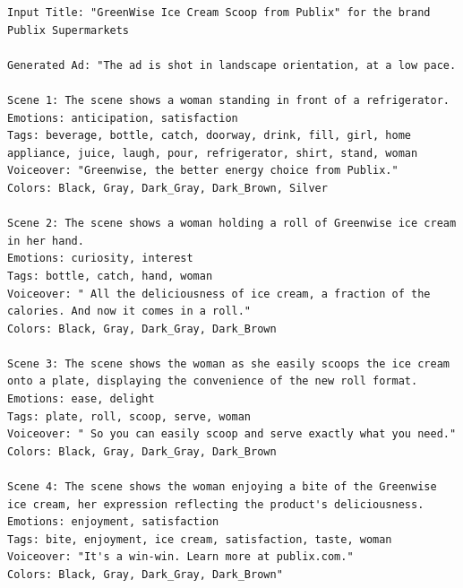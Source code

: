 \begin{lstlisting}[caption={Advertisement generated by Henry-SEED for a Publix ad. Original Ad: \url{https://www.youtube.com/watch?v=HH0VWvs-cFg}},frame=single,breaklines=true,basicstyle=\tiny, label={lst:publix}]
Input Title: "GreenWise Ice Cream Scoop from Publix" for the brand Publix Supermarkets

Generated Ad: "The ad is shot in landscape orientation, at a low pace. 

Scene 1: The scene shows a woman standing in front of a refrigerator.
Emotions: anticipation, satisfaction
Tags: beverage, bottle, catch, doorway, drink, fill, girl, home appliance, juice, laugh, pour, refrigerator, shirt, stand, woman
Voiceover: "Greenwise, the better energy choice from Publix."
Colors: Black, Gray, Dark_Gray, Dark_Brown, Silver

Scene 2: The scene shows a woman holding a roll of Greenwise ice cream in her hand.
Emotions: curiosity, interest
Tags: bottle, catch, hand, woman
Voiceover: " All the deliciousness of ice cream, a fraction of the calories. And now it comes in a roll."
Colors: Black, Gray, Dark_Gray, Dark_Brown

Scene 3: The scene shows the woman as she easily scoops the ice cream onto a plate, displaying the convenience of the new roll format.
Emotions: ease, delight
Tags: plate, roll, scoop, serve, woman
Voiceover: " So you can easily scoop and serve exactly what you need."
Colors: Black, Gray, Dark_Gray, Dark_Brown

Scene 4: The scene shows the woman enjoying a bite of the Greenwise ice cream, her expression reflecting the product's deliciousness.
Emotions: enjoyment, satisfaction
Tags: bite, enjoyment, ice cream, satisfaction, taste, woman
Voiceover: "It's a win-win. Learn more at publix.com."
Colors: Black, Gray, Dark_Gray, Dark_Brown"

\end{lstlisting}


